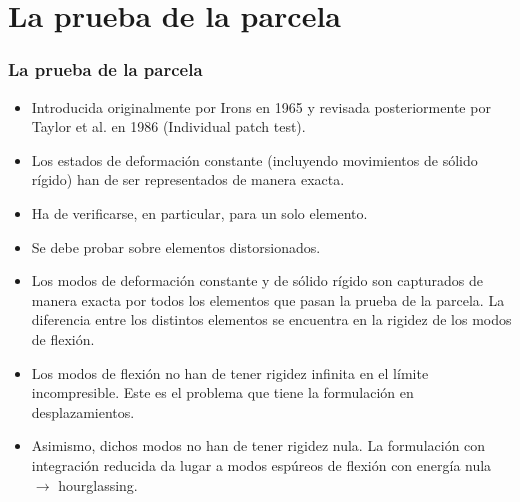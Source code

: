 \documentclass{beamer}
\begin{document}
\section{La prueba de la parcela}
\begin{frame}
\frametitle{La prueba de la parcela}
\begin{small}
\begin{itemize}
\item Introducida originalmente por Irons en 1965 y revisada posteriormente
por Taylor et al. en 1986 (Individual patch test). 
\item Los estados de deformación constante (incluyendo movimientos
de sólido rígido) han de ser representados de manera exacta.
\item Ha de verificarse, en particular, para un solo elemento.
\item Se debe probar sobre elementos distorsionados.
\item Los modos de deformación constante y de sólido rígido son
capturados de manera exacta por todos los elementos que pasan la
prueba de la parcela. La diferencia entre los distintos elementos se
encuentra en la rigidez de los modos de flexión.
\item Los modos de flexión no han de tener rigidez infinita en el
límite incompresible. Este es el problema que tiene la formulación en
desplazamientos.
\item Asimismo, dichos modos no han de tener rigidez nula.
La formulación con integración reducida da lugar
a modos espúreos de flexión con energía nula $\rightarrow$ hourglassing.
\end{itemize}
\end{small}
\end{frame}
\end{document}
